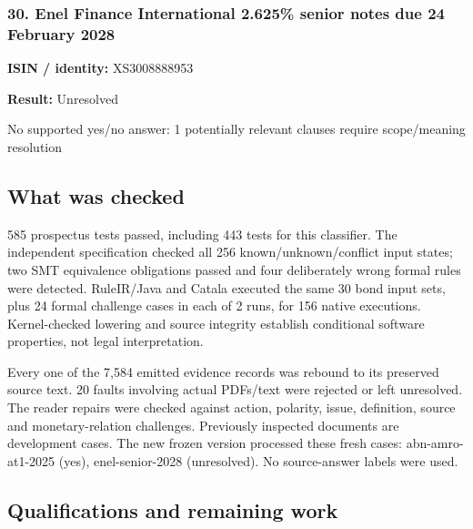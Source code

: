 \documentclass[
  11pt,
]{article}
\begin{document}
\begin{minipage}{\linewidth}

\hypertarget{enel-finance-international-2.625-senior-notes-due-24-february-2028}{%
\subsubsection{30. Enel Finance International 2.625\% senior notes due
24 February
2028}\label{enel-finance-international-2.625-senior-notes-due-24-february-2028}}

\textbf{ISIN / identity:} XS3008888953

\textbf{Result:} Unresolved

No supported yes/no answer: 1 potentially relevant clauses require
scope/meaning resolution

\end{minipage}
\par\addvspace{1.1em}

\hypertarget{what-was-checked}{%
\subsection{What was checked}\label{what-was-checked}}

585 prospectus tests passed, including 443 tests for this classifier.
The independent specification checked all 256 known/unknown/conflict
input states; two SMT equivalence obligations passed and four
deliberately wrong formal rules were detected. RuleIR/Java and Catala
executed the same 30 bond input sets, plus 24 formal challenge cases in
each of 2 runs, for 156 native executions. Kernel-checked lowering and
source integrity establish conditional software properties, not legal
interpretation.

Every one of the 7,584 emitted evidence records was rebound to its
preserved source text. 20 faults involving actual PDFs/text were
rejected or left unresolved. The reader repairs were checked against
action, polarity, issue, definition, source and monetary-relation
challenges. Previously inspected documents are development cases. The
new frozen version processed these fresh cases: abn-amro-at1-2025 (yes),
enel-senior-2028 (unresolved). No source-answer labels were used.

\hypertarget{qualifications-and-remaining-work}{%
\subsection{Qualifications and remaining
work}\label{qualifications-and-remaining-work}}
\end{document}
